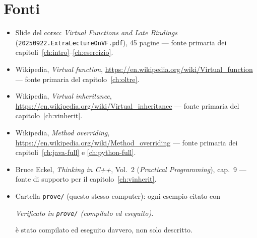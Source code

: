 \documentclass{report}
\newcommand{\code}[1]{\texttt{\small #1}}
\newcommand{\fonteprove}[1]{{\footnotesize\itshape\color{gray} Verificato in \code{prove/#1} (compilato ed eseguito).\par}}
\begin{document}
\chapter{Fonti}\label{ch:fonti}

\begin{itemize}
    \item Slide del corso: \emph{Virtual Functions and Late Bindings}
          (\code{20250922.ExtraLectureOnVF.pdf}), 45 pagine --- fonte
          primaria dei capitoli~\ref{ch:intro}--\ref{ch:esercizio}.
    \item Wikipedia, \emph{Virtual function},
          \url{https://en.wikipedia.org/wiki/Virtual_function} --- fonte
          primaria del capitolo~\ref{ch:oltre}.
    \item Wikipedia, \emph{Virtual inheritance},
          \url{https://en.wikipedia.org/wiki/Virtual_inheritance} ---
          fonte primaria del capitolo~\ref{ch:vinherit}.
    \item Wikipedia, \emph{Method overriding},
          \url{https://en.wikipedia.org/wiki/Method_overriding} ---
          fonte primaria dei capitoli~\ref{ch:java-full} e
          \ref{ch:python-full}.
    \item Bruce Eckel, \emph{Thinking in C++}, Vol.~2 (\emph{Practical
          Programming}), cap.~9 --- fonte di supporto per il
          capitolo~\ref{ch:vinherit}.
    \item Cartella \code{prove/} (questo stesso computer): ogni esempio
          citato con \fonteprove{} è stato compilato ed eseguito
          davvero, non solo descritto.
\end{itemize}
\end{document}

